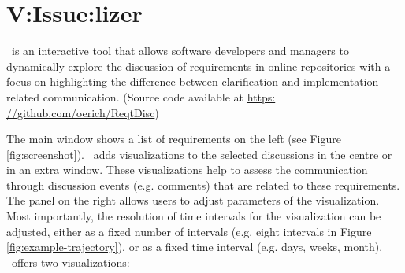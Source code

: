 \section{V:Issue:lizer}


\viss\  is an interactive tool that allows software developers and managers to dynamically explore the discussion of requirements  in online repositories with a focus on highlighting the difference between clarification and implementation related communication. (Source code available at \url{https: //github.com/oerich/ReqtDisc})


The main window shows a list of requirements on the  left  (see Figure \ref{fig:screenshot}).
\viss\ adds visualizations to the selected discussions in the centre or in an extra window. 
These visualizations help to assess the communication through discussion events (e.g. comments) that are related to these requirements.
The panel on the right allows users to adjust parameters of the visualization.
Most importantly, the resolution of time intervals for the visualization can be adjusted, either as a fixed number of intervals (e.g. eight intervals in Figure \ref{fig:example-trajectory}), or as a fixed time interval (e.g. days, weeks, month).
%
\viss\  offers  two visualizations: 

